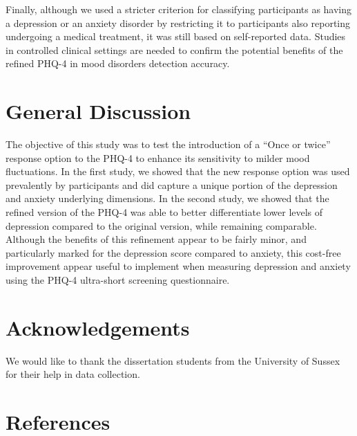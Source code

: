 \documentclass[
  jou,
  floatsintext,
  longtable,
  nolmodern,
  notxfonts,
  notimes,
  colorlinks=true,linkcolor=blue,citecolor=blue,urlcolor=blue]{apa7}
\begin{document}
Finally, although we used a stricter criterion for classifying
participants as having a depression or an anxiety disorder by
restricting it to participants also reporting undergoing a medical
treatment, it was still based on self-reported data. Studies in
controlled clinical settings are needed to confirm the potential
benefits of the refined PHQ-4 in mood disorders detection accuracy.

\section{General Discussion}\label{general-discussion}

The objective of this study was to test the introduction of a ``Once or
twice'' response option to the PHQ-4 to enhance its sensitivity to
milder mood fluctuations. In the first study, we showed that the new
response option was used prevalently by participants and did capture a
unique portion of the depression and anxiety underlying dimensions. In
the second study, we showed that the refined version of the PHQ-4 was
able to better differentiate lower levels of depression compared to the
original version, while remaining comparable. Although the benefits of
this refinement appear to be fairly minor, and particularly marked for
the depression score compared to anxiety, this cost-free improvement
appear useful to implement when measuring depression and anxiety using
the PHQ-4 ultra-short screening questionnaire.

\section{Acknowledgements}\label{acknowledgements}

We would like to thank the dissertation students from the University of
Sussex for their help in data collection.

\section{References}\label{references}
\end{document}
